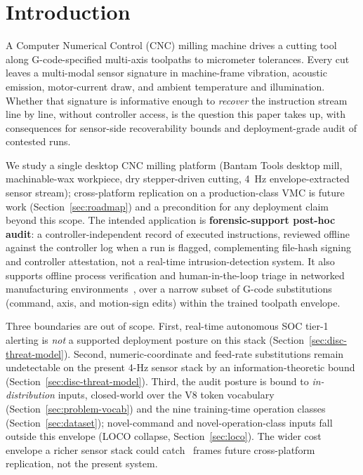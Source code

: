 \documentclass[sensors,article,submit,moreauthors,pdftex]{Definitions/mdpi}
\begin{document}
\section{Introduction}
\label{sec:introduction}

A Computer Numerical Control (CNC) milling machine drives a cutting tool along G-code-specified multi-axis toolpaths to micrometer tolerances. Every cut leaves a multi-modal sensor signature in machine-frame vibration, acoustic emission, motor-current draw, and ambient temperature and illumination. Whether that signature is informative enough to \emph{recover} the instruction stream line by line, without controller access, is the question this paper takes up, with consequences for sensor-side recoverability bounds and deployment-grade audit of contested runs.

We study a single desktop CNC milling platform (Bantam Tools desktop mill, machinable-wax workpiece, dry stepper-driven cutting, 4~Hz envelope-extracted sensor stream); cross-platform replication on a production-class VMC is future work (Section~\ref{sec:roadmap}) and a precondition for any deployment claim beyond this scope. The intended application is \textbf{forensic-support post-hoc audit}: a controller-independent record of executed instructions, reviewed offline against the controller log when a run is flagged, complementing file-hash signing and controller attestation, not a real-time intrusion-detection system. It also supports offline process verification and human-in-the-loop triage in networked manufacturing environments~\cite{nist2023sp80082,nist2024fmnet,sturm2014cyber,yampolskiy2018security,zhong2017intelligent,kimmell2025cnc}, over a narrow subset of G-code substitutions (command, axis, and motion-sign edits) within the trained toolpath envelope.

Three boundaries are out of scope. First, real-time autonomous SOC tier-1 alerting is \emph{not} a supported deployment posture on this stack (Section~\ref{sec:disc-threat-model}). Second, numeric-coordinate and feed-rate substitutions remain undetectable on the present 4-Hz sensor stack by an information-theoretic bound (Section~\ref{sec:disc-threat-model}). Third, the audit posture is bound to \emph{in-distribution} inputs, closed-world over the V8 token vocabulary (Section~\ref{sec:problem-vocab}) and the nine training-time operation classes (Section~\ref{sec:dataset}); novel-command and novel-operation-class inputs fall outside this envelope (LOCO collapse, Section~\ref{sec:loco}). The wider cost envelope a richer sensor stack could catch~\cite{teti2010advanced,serin2020tool} frames future cross-platform replication, not the present system.
\end{document}
